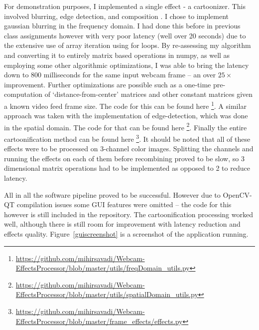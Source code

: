 \documentclass[conference]{IEEEtran}
\begin{document}
        For demonstration purposes, I implemented a single effect - a cartoonizer. This involved blurring, edge
        detection, and composition \cite{cartoonification}. I chose to implement gaussian blurring in the frequency
        domain. I had done this before in previous class assignments however with very poor latency (well over 20
        seconds) due to the extensive use of array iteration using for loops. By re-assessing my algorithm and
        converting it to entirely matrix based operations in numpy, as well as employing some other algorithmic
        optimizations, I was able to bring the latency down to 800 milliseconds for the same input webcam frame -- an
        over $25\times$ improvement. Further optimizations are possible such as a one-time pre-computation of
        `distance-from-center' matrices and other constant matrices given a known video feed frame size. The code for
        this can be found here
        \footnote{\url{https://github.com/mihirsavadi/Webcam-EffectsProcessor/blob/master/utils/freqDomain_utils.py}}. A
        similar approach was taken with the implementation of edge-detection, which was done in the spatial domain. The
        code for that can be found here
        \footnote{\url{https://github.com/mihirsavadi/Webcam-EffectsProcessor/blob/master/utils/spatialDomain_utils.py}}.
        Finally the entire cartoonification method can be found here
        \footnote{\url{https://github.com/mihirsavadi/Webcam-EffectsProcessor/blob/master/frame_effects/effects.py}}. It
        should be noted that all of these effects were to be processed on 3-channel color images. Splitting the channels
        and running the effects on each of them before recombining proved to be slow, so 3 dimensional matrix operations
        had to be implemented as opposed to 2 to reduce latency.

        All in all the software pipeline proved to be successful. However due to OpenCV-QT compilation issues some GUI
        features were omitted -- the code for this however is still included in the repository. The cartoonification
        processing worked well, although there is still room for improvement with latency reduction and effects quality.
        Figure~\ref{guiscreenshot} is a screenshot of the application running.
        
\end{document}
